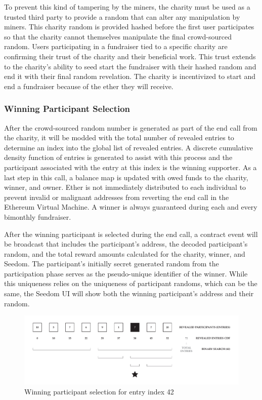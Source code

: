 \documentclass[11pt]{article}
\begin{document}
To prevent this kind of tampering by the miners, the charity must be used as a trusted third party to provide a random that can alter any manipulation by miners. This charity random is provided hashed before the first user participates so that the charity cannot themselves manipulate the final crowd-sourced random. Users participating in a fundraiser tied to a specific charity are confirming their trust of the charity and their beneficial work. This trust extends to the charity's ability to seed start the fundraiser with their hashed random and end it with their final random revelation. The charity is incentivized to start and end a fundraiser because of the ether they will receive.

\subsubsection{Winning Participant Selection}

After the crowd-sourced random number is generated as part of the end call from the charity, it will be modded with the total number of revealed entries to determine an index into the global list of revealed entries. A discrete cumulative density function of entries is generated to assist with this process and the participant associated with the entry at this index is the winning supporter. As a last step in this call, a balance map is updated with owed funds to the charity, winner, and owner. Ether is not immediately distributed to each individual to prevent invalid or malignant addresses from reverting the end call in the Ethereum Virtual Machine. A winner is always guaranteed during each and every bimonthly fundraiser.

After the winning participant is selected during the end call, a contract event will be broadcast that includes the participant's address, the decoded participant's random, and the total reward amounts calculated for the charity, winner, and Seedom. The participant's initially secret generated random from the participation phase serves as the pseudo-unique identifier of the winner. While this uniqueness relies on the uniqueness of participant randoms, which can be the same, the Seedom UI will show both the winning participant's address and their random.

\begin{figure}[H]
\begin{center}
\includegraphics[width=1.0\textwidth]{winningParticipantSelection.pdf}
\caption{Winning participant selection for entry index 42}
\label{figure:winningParticipantSelection}
\end{center}
\end{figure}
\end{document}
